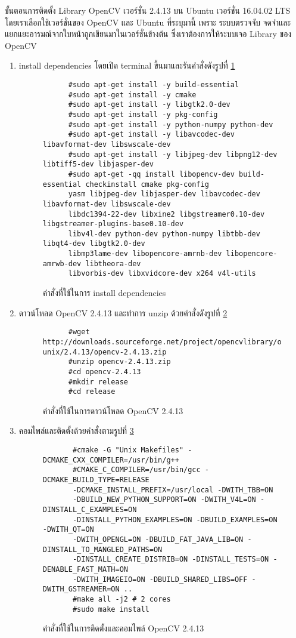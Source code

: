 	ขั้นตอนการติดตั้ง Library OpenCV เวอร์ชั่น 2.4.13 บน Ubuntu เวอร์ชั่น 16.04.02 LTS โดยเราเลือกใช้เวอร์ชั่นของ OpenCV และ Ubuntu ที่ระบุมานี้ เพราะ ระบบตรวจจับ จดจำและแยกแยะอารมณ์จากใบหน้าถูกเขียนมาในเวอร์ชั่นข้างต้น ซึ่งเราต้องการให้ระบบเจอ Library ของ OpenCV
        \begin{enumerate}
          \item install dependencies โดยเปิด terminal ขึ้นมาและรันคำสั่งดังรูปที่ \ref{opencv1}
\begin{figure}[t]
  \begin{lstlisting}
      #sudo apt-get install -y build-essential
      #sudo apt-get install -y cmake
      #sudo apt-get install -y libgtk2.0-dev
      #sudo apt-get install -y pkg-config
      #sudo apt-get install -y python-numpy python-dev
      #sudo apt-get install -y libavcodec-dev libavformat-dev libswscale-dev
      #sudo apt-get install -y libjpeg-dev libpng12-dev libtiff5-dev libjasper-dev
      #sudo apt-get -qq install libopencv-dev build-essential checkinstall cmake pkg-config
      yasm libjpeg-dev libjasper-dev libavcodec-dev libavformat-dev libswscale-dev
      libdc1394-22-dev libxine2 libgstreamer0.10-dev libgstreamer-plugins-base0.10-dev
      libv4l-dev python-dev python-numpy libtbb-dev libqt4-dev libgtk2.0-dev
      libmp3lame-dev libopencore-amrnb-dev libopencore-amrwb-dev libtheora-dev
      libvorbis-dev libxvidcore-dev x264 v4l-utils
\end{lstlisting}
\caption{คำสั่งที่ใช้ในการ install dependencies}
\label{opencv1}
\hrulefill
\end{figure}
\item ดาวน์โหลด OpenCV 2.4.13 และทำการ unzip ด้วยคำสั่งดังรูปที่ \ref{opencv2}
  \begin{figure}[t]
\begin{lstlisting}
      #wget http://downloads.sourceforge.net/project/opencvlibrary/opencv-unix/2.4.13/opencv-2.4.13.zip
      #unzip opencv-2.4.13.zip
      #cd opencv-2.4.13
      #mkdir release
      #cd release
\end{lstlisting}
\caption{คำสั่งที่ใช้ในการดาวน์โหลด OpenCV 2.4.13}
\label{opencv2}
\hrulefill
  \end{figure}
\item คอมไพล์และติดตั้งด้วยคำสั่งตามรูปที่ \ref{opencv3}
  \begin{figure}[t]
\begin{lstlisting}
       #cmake -G "Unix Makefiles" -DCMAKE_CXX_COMPILER=/usr/bin/g++
       #CMAKE_C_COMPILER=/usr/bin/gcc -DCMAKE_BUILD_TYPE=RELEASE
       -DCMAKE_INSTALL_PREFIX=/usr/local -DWITH_TBB=ON
       -DBUILD_NEW_PYTHON_SUPPORT=ON -DWITH_V4L=ON -DINSTALL_C_EXAMPLES=ON
       -DINSTALL_PYTHON_EXAMPLES=ON -DBUILD_EXAMPLES=ON -DWITH_QT=ON
       -DWITH_OPENGL=ON -DBUILD_FAT_JAVA_LIB=ON -DINSTALL_TO_MANGLED_PATHS=ON
       -DINSTALL_CREATE_DISTRIB=ON -DINSTALL_TESTS=ON -DENABLE_FAST_MATH=ON
       -DWITH_IMAGEIO=ON -DBUILD_SHARED_LIBS=OFF -DWITH_GSTREAMER=ON ..
       #make all -j2 # 2 cores
       #sudo make install
\end{lstlisting}
\caption{คำสั่งที่ใช้ในการติดตั้งและคอมไพล์ OpenCV 2.4.13}
\label{opencv3}
\hrulefill
  \end{figure}
   \end{enumerate}
